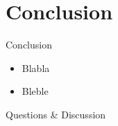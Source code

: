 \documentclass{beamer}
\begin{document}
\begin{frame}
\end{frame}



\begin{frame}
\end{frame}




\section{Conclusion}

\begin{frame}{Conclusion}
\begin{itemize}
    \item Blabla
    \item Bleble
\end{itemize}
\end{frame}



\begin{frame}
  \titlepage
  \begin{center}
  \huge Questions \& Discussion
  \end{center}
\end{frame}
\end{document}
